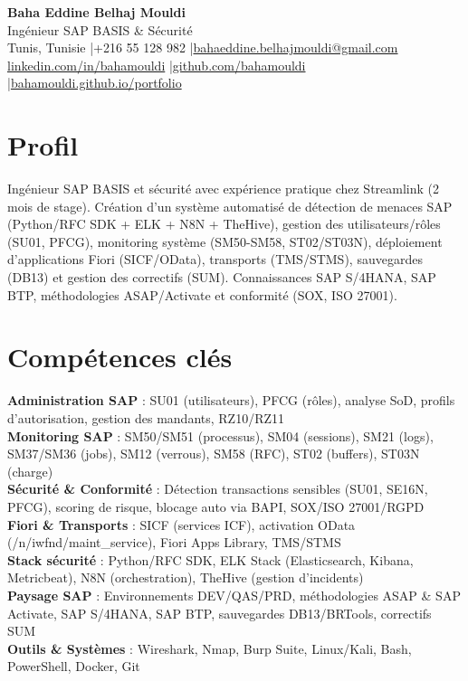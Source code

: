 \documentclass[a4paper,10pt]{article}
\begin{document}
\begin{center}
{\LARGE\bfseries\color{navy} Baha Eddine Belhaj Mouldi}\\[3pt]
{\large Ingénieur SAP BASIS \& Sécurité}\\[5pt]
Tunis, Tunisie \quad|\quad +216 55 128 982 \quad|\quad \href{mailto:bahaeddine.belhajmouldi@gmail.com}{bahaeddine.belhajmouldi@gmail.com}\\[1pt]
\href{https://www.linkedin.com/in/bahamouldi}{linkedin.com/in/bahamouldi} \quad|\quad \href{https://github.com/bahamouldi}{github.com/bahamouldi} \quad|\quad \href{https://bahamouldi.github.io/portfolio/}{bahamouldi.github.io/portfolio}
\end{center}
\vspace{1pt}
\section{Profil}
Ingénieur SAP BASIS et sécurité avec expérience pratique chez Streamlink (2 mois de stage). Création d'un système automatisé de détection de menaces SAP (Python/RFC SDK + ELK + N8N + TheHive), gestion des utilisateurs/rôles (SU01, PFCG), monitoring système (SM50-SM58, ST02/ST03N), déploiement d'applications Fiori (SICF/OData), transports (TMS/STMS), sauvegardes (DB13) et gestion des correctifs (SUM). Connaissances SAP S/4HANA, SAP BTP, méthodologies ASAP/Activate et conformité (SOX, ISO 27001).
\section{Compétences clés}
\textbf{Administration SAP} : SU01 (utilisateurs), PFCG (rôles), analyse SoD, profils d'autorisation, gestion des mandants, RZ10/RZ11\\[0.5pt]
\textbf{Monitoring SAP} : SM50/SM51 (processus), SM04 (sessions), SM21 (logs), SM37/SM36 (jobs), SM12 (verrous), SM58 (RFC), ST02 (buffers), ST03N (charge)\\[0.5pt]
\textbf{Sécurité \& Conformité} : Détection transactions sensibles (SU01, SE16N, PFCG), scoring de risque, blocage auto via BAPI, SOX/ISO 27001/RGPD\\[0.5pt]
\textbf{Fiori \& Transports} : SICF (services ICF), activation OData (/n/iwfnd/maint\_service), Fiori Apps Library, TMS/STMS\\[0.5pt]
\textbf{Stack sécurité} : Python/RFC SDK, ELK Stack (Elasticsearch, Kibana, Metricbeat), N8N (orchestration), TheHive (gestion d'incidents)\\[0.5pt]
\textbf{Paysage SAP} : Environnements DEV/QAS/PRD, méthodologies ASAP \& SAP Activate, SAP S/4HANA, SAP BTP, sauvegardes DB13/BRTools, correctifs SUM\\[0.5pt]
\textbf{Outils \& Systèmes} : Wireshark, Nmap, Burp Suite, Linux/Kali, Bash, PowerShell, Docker, Git
\end{document}
